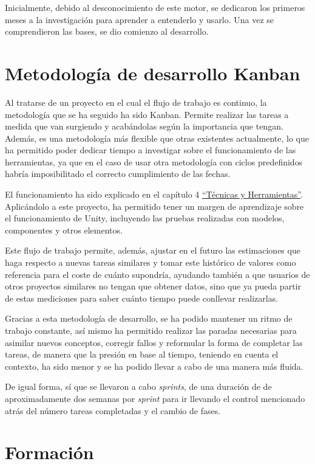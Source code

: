 Inicialmente, debido al desconocimiento de este motor, se dedicaron los primeros meses a la investigación para aprender a entenderlo y usarlo. Una vez se comprendieron las bases, se dio comienzo al desarrollo.

\section{Metodología de desarrollo Kanban}

Al tratarse de un proyecto en el cual el flujo de trabajo es continuo, la metodología que se ha seguido ha sido Kanban. Permite realizar las tareas a medida que van surgiendo y acabándolas según la importancia que tengan. Además, es una metodología más flexible que otras existentes actualmente, lo que ha permitido poder dedicar tiempo a investigar sobre el funcionamiento de las herramientas, ya que en el caso de usar otra metodología con ciclos predefinidos habría imposibilitado el correcto cumplimiento de las fechas.

El funcionamiento ha sido explicado en el capítulo 4 \hyperref[cap:tecnicas]{``Técnicas y Herramientas''}. Aplicándolo a este proyecto, ha permitido tener un margen de aprendizaje sobre el funcionamiento de Unity, incluyendo las pruebas realizadas con modelos, componentes y otros elementos.

Este flujo de trabajo permite, además, ajustar en el futuro las estimaciones que haga respecto a nuevas tareas similares y tomar este histórico de valores como referencia para el coste de cuánto supondría, ayudando también a que usuarios de otros proyectos similares no tengan que obtener datos, sino que ya pueda partir de estas mediciones para saber cuánto tiempo puede conllevar realizarlas.

Gracias a esta metodología de desarrollo, se ha podido mantener un ritmo de trabajo constante, así mismo ha permitido realizar las paradas necesarias para asimilar nuevos conceptos, corregir fallos y reformular la forma de completar las tareas, de manera que la presión en base al tiempo, teniendo en cuenta el contexto, ha sido menor y se ha podido llevar a cabo de una manera más fluida.

De igual forma, sí que se llevaron a cabo \textit{sprints}, de una duración de de aproximadamente dos semanas por \textit{sprint} para ir llevando el control mencionado atrás del número tareas completadas y el cambio de fases.

\section{Formación}


